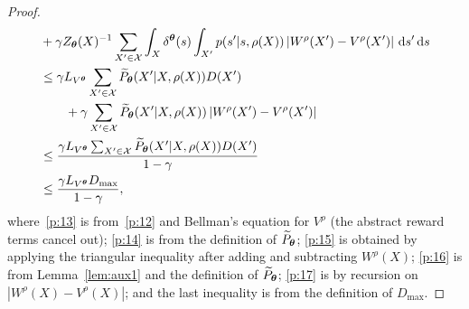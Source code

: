 \begin{proof}
\begin{align}
	& + 
	\gamma Z_{\boldsymbol{\theta}}(X)^{-1} \sum_{X'\in\mathcal{X}} \int_{X}\delta^{\boldsymbol{\theta}}(s) \int_{X'}p(s'|s,\rho(X))\left|W^{\rho}(X') - V^{\rho}(X')\right|\,\mathrm{d} s'\,\mathrm{d} s \label{p:15}\\
	&\leq \gamma L_{V^{\boldsymbol{\theta}}}\sum_{X'\in\mathcal{X}}\widetilde{P}_{\boldsymbol{\theta}}(X'|X,\rho(X))D(X')	\nonumber\\
	&\qquad + \gamma \sum_{X'\in\mathcal{X}}\widetilde{P}_{\boldsymbol{\theta}}(X'|X,\rho(X))\left|W^{\rho}(X') - V^{\rho}(X')\right| \label{p:16}\\
	&\leq \frac{\gamma L_{V^{\boldsymbol{\theta}}}\sum_{X'\in\mathcal{X}}\widetilde{P}_{\boldsymbol{\theta}}(X'|X,\rho(X))D(X')}{1-\gamma} \label{p:17}\\
	&\leq \frac{\gamma L_{V^{\boldsymbol{\theta}}}D_{\max}}{1-\gamma},\nonumber
	\end{align}
	where~\eqref{p:13} is from~\eqref{p:12} and Bellman's equation for $V^{\rho}$ (the abstract reward terms cancel out); \eqref{p:14} is from the definition of $\widetilde{P}_{\boldsymbol{\theta}}$; \eqref{p:15} is obtained by applying the triangular inequality after adding and subtracting $W^{\rho}(X)$; \eqref{p:16} is from Lemma~\ref{lem:aux1} and the definition of $\widetilde{P}_{\boldsymbol{\theta}}$; \eqref{p:17} is by recursion on $\left|W^{\rho}(X)-V^{\rho}(X)\right|$; and the last inequality is from the definition of $D_{\max}$.
\end{proof}